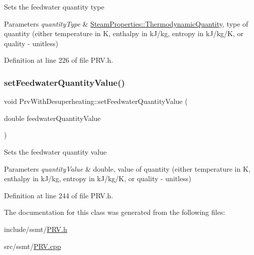 Sets the feedwater quantity type


\begin{DoxyParams}{Parameters}
{\em quantity\+Type} & \hyperlink{class_steam_properties_ae0294bedf7d178c2d8fb6aed0f62fbff}{Steam\+Properties\+::\+Thermodynamic\+Quantity}, type of quantity (either temperature in K, enthalpy in k\+J/kg, entropy in k\+J/kg/K, or quality -\/ unitless) \\
\hline
\end{DoxyParams}


Definition at line 226 of file P\+R\+V.\+h.

\mbox{\label{class_prv_with_desuperheating_afc17940f7d61898eda1bb4a6f1fea8c3}} 
\subsubsection{\texorpdfstring{set\+Feedwater\+Quantity\+Value()}{setFeedwaterQuantityValue()}}
{\footnotesize\ttfamily void Prv\+With\+Desuperheating\+::set\+Feedwater\+Quantity\+Value (\begin{DoxyParamCaption}\item[{double}]{feedwater\+Quantity\+Value }\end{DoxyParamCaption})\hspace{0.3cm}{\ttfamily [inline]}}

Sets the feedwater quantity value


\begin{DoxyParams}{Parameters}
{\em quantity\+Value} & double, value of quantity (either temperature in K, enthalpy in k\+J/kg, entropy in k\+J/kg/K, or quality -\/ unitless) \\
\hline
\end{DoxyParams}


Definition at line 244 of file P\+R\+V.\+h.



The documentation for this class was generated from the following files\+:\begin{DoxyCompactItemize}
\item 
include/ssmt/\hyperlink{_p_r_v_8h}{P\+R\+V.\+h}\item 
src/ssmt/\hyperlink{_p_r_v_8cpp}{P\+R\+V.\+cpp}\end{DoxyCompactItemize}
